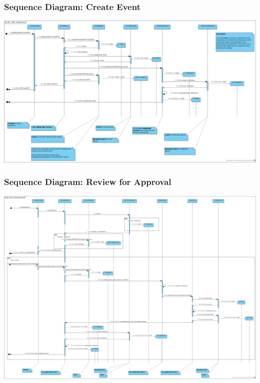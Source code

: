 \subsubsection{Sequence Diagram: Create Event}
        \includegraphics[scale=0.34]{images/SD-UC04-CreateEvent.png}
        \label{fig:SD-CreateEvent}
\subsubsection{Sequence Diagram: Review for Approval}
        \includegraphics[scale=0.27]{images/SD-UC09-ReviewForApproval.png}
        \label{fig:SD-ReviewForApproval}
